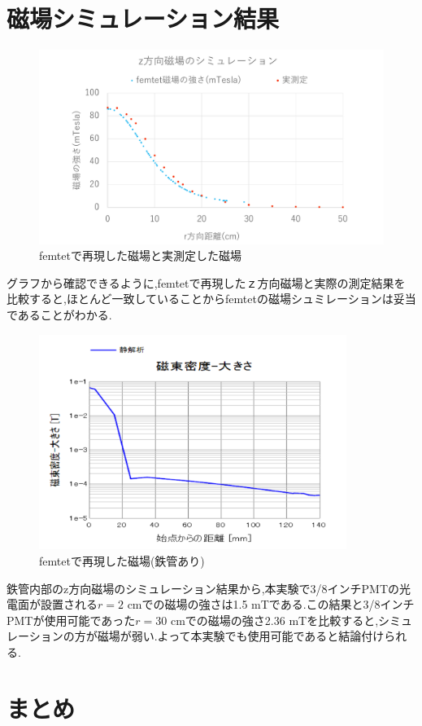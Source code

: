 \section{磁場シミュレーション結果}
\begin{figure}[h]
	\centering
		\includegraphics[width=16cm]{fig/iguchi/magnetgraph2.pdf}
	\caption{femtetで再現した磁場と実測定した磁場}
	\label{magnetgraph2}
\end{figure}

グラフから確認できるように,femtetで再現したｚ方向磁場と実際の測定結果を比較すると,ほとんど一致していることからfemtetの磁場シュミレーションは妥当であることがわかる.
\begin{figure}[tbp]
	\centering
		\includegraphics[width=10cm]{fig/iguchi/maggraphinFe.pdf}
	\caption{femtetで再現した磁場(鉄管あり)}
	\label{maggraphinFe}
\end{figure}
鉄管内部のz方向磁場のシミュレーション結果から,本実験で3/8インチPMTの光電面が設置される$r=2$ cmでの磁場の強さは1.5 mTである.この結果と3/8インチPMTが使用可能であった$r=30$ cmでの磁場の強さ2.36 mTを比較すると,シミュレーションの方が磁場が弱い.よって本実験でも使用可能であると結論付けられる.

\section{まとめ}




